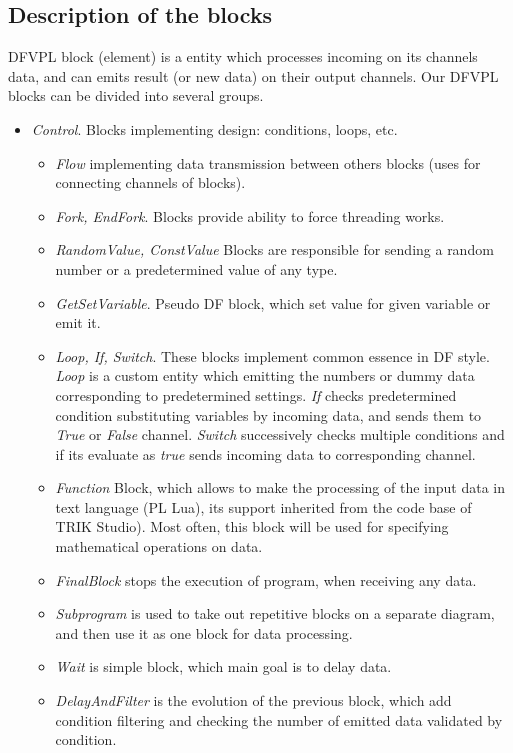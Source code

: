 \documentclass[conference,compsoc]{IEEEtran}
\begin{document}
\subsection{Description of the blocks}
DFVPL block (element) is a entity which processes incoming on its channels data, and can emits result (or new data) on their output channels. Our DFVPL blocks can be divided into several groups.

\begin{itemize}
\item \textit{Control}. Blocks implementing design: conditions, loops, etc.
\begin{itemize}
\item \textit{Flow} implementing data transmission between others blocks (uses for connecting channels of blocks).
\item \textit{Fork, EndFork}. Blocks provide ability to force threading works.
\item \textit{RandomValue, ConstValue} Blocks are responsible for sending a random number or a predetermined value of any type.
\item \textit{GetSetVariable}. Pseudo DF block, which set value for given variable or emit it.
\item \textit{Loop, If, Switch}. These blocks implement common essence in DF style. \textit{Loop} is a custom entity which emitting the numbers or dummy data corresponding to predetermined settings. \textit{If} checks predetermined condition substituting variables by incoming data, and sends them to \textit{True} or \textit{False} channel. \textit{Switch} successively checks multiple conditions and if its evaluate as \textit{true} sends incoming data to corresponding channel.  	
\item \textit{Function} Block, which allows to make the processing of the input data in text language (PL Lua\cite{lua}), its support inherited from the code base of TRIK Studio). Most often, this block will be used for specifying mathematical operations on data.
\item \textit{FinalBlock} stops the execution of program, when receiving any data. 
\item \textit{Subprogram} is used to take out repetitive blocks on a separate diagram, and then use it as one block for data processing.
\item \textit{Wait} is simple block, which main goal is to delay data.
\item \textit{DelayAndFilter} is the evolution of the previous block, which add condition filtering and checking the number of emitted data validated by condition.

\end{itemize}
\end{itemize}
\end{document}
